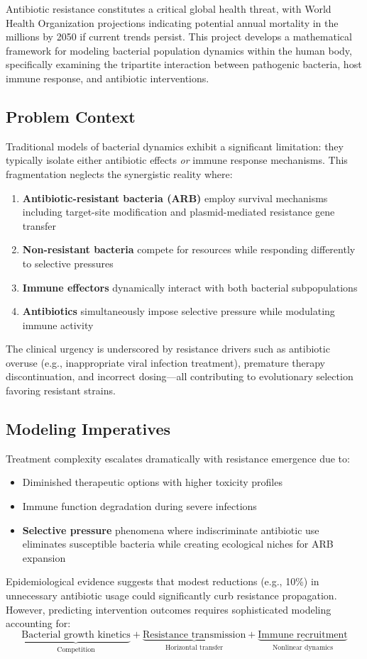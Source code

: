 
	Antibiotic resistance constitutes a critical global health threat, with World Health Organization projections indicating potential annual mortality in the millions by 2050 if current trends persist. This project develops a mathematical framework for modeling bacterial population dynamics within the human body, specifically examining the tripartite interaction between pathogenic bacteria, host immune response, and antibiotic interventions. 
	
	\subsection{Problem Context}
	Traditional models of bacterial dynamics exhibit a significant limitation: they typically isolate either antibiotic effects \textit{or} immune response mechanisms. This fragmentation neglects the synergistic reality where:
	\begin{enumerate}
		\item \textbf{Antibiotic-resistant bacteria (ARB)} employ survival mechanisms including target-site modification and plasmid-mediated resistance gene transfer
		\item \textbf{Non-resistant bacteria} compete for resources while responding differently to selective pressures
		\item \textbf{Immune effectors} dynamically interact with both bacterial subpopulations
		\item \textbf{Antibiotics} simultaneously impose selective pressure while modulating immune activity
	\end{enumerate}
	The clinical urgency is underscored by resistance drivers such as antibiotic overuse (e.g., inappropriate viral infection treatment), premature therapy discontinuation, and incorrect dosing—all contributing to evolutionary selection favoring resistant strains.
	
	\subsection{Modeling Imperatives}
	Treatment complexity escalates dramatically with resistance emergence due to:
	\begin{itemize}
		\item Diminished therapeutic options with higher toxicity profiles
		\item Immune function degradation during severe infections
		\item \textbf{Selective pressure} phenomena where indiscriminate antibiotic use eliminates susceptible bacteria while creating ecological niches for ARB expansion
	\end{itemize}
	Epidemiological evidence suggests that modest reductions (e.g., 10\%) in unnecessary antibiotic usage could significantly curb resistance propagation. However, predicting intervention outcomes requires sophisticated modeling accounting for:
	\begin{equation*}
		\underbrace{\text{Bacterial growth kinetics}}_\text{Competition} + \underbrace{\text{Resistance transmission}}_\text{Horizontal transfer} + \underbrace{\text{Immune recruitment}}_\text{Nonlinear dynamics}
	\end{equation*}
	
